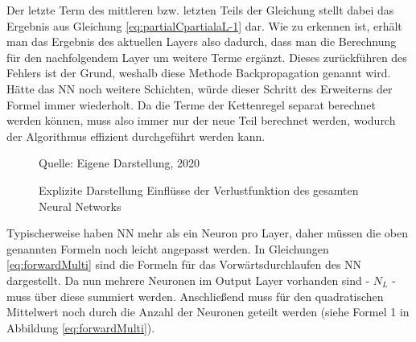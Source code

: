 Der letzte Term des mittleren bzw. letzten Teils der Gleichung stellt dabei das Ergebnis aus Gleichung \ref{eq:partialCpartialaL-1} dar. Wie zu erkennen ist, erhält man das Ergebnis des aktuellen Layers also dadurch, dass man die Berechnung für den nachfolgendem Layer um weitere Terme ergänzt. Dieses zurückführen des Fehlers ist der Grund, weshalb diese Methode Backpropagation genannt wird. Hätte das \ac{NN} noch weitere Schichten, würde dieser Schritt des Erweiterns der Formel immer wiederholt. Da die Terme der Kettenregel separat berechnet werden können, muss also immer nur der neue Teil berechnet werden, wodurch der Algorithmus effizient durchgeführt werden kann.

\begin{figure}[t]
    \centering
    \caption[]{Explizite Darstellung Einflüsse der Verlustfunktion des gesamten Neural Networks}
    \label{fig:unfoldedCost2}
    Quelle: Eigene Darstellung, 2020
\end{figure}

Typischerweise haben \ac{NN} mehr als ein Neuron pro Layer, daher müssen die oben genannten Formeln noch leicht angepasst werden. In Gleichungen \ref{eq:forwardMulti} sind die Formeln für das Vorwärtsdurchlaufen des \ac{NN} dargestellt. Da nun mehrere Neuronen im Output Layer vorhanden sind - $N_L$ - muss über diese summiert werden. Anschließend muss für den quadratischen Mittelwert noch durch die Anzahl der Neuronen geteilt werden (siehe Formel 1 in Abbildung \ref{eq:forwardMulti}).

